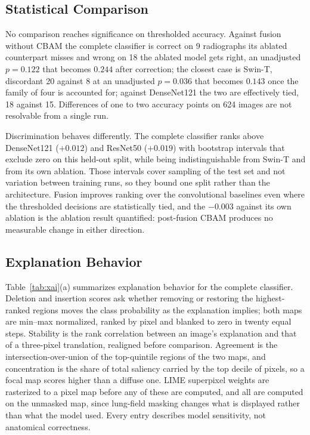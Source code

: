 \documentclass[conference]{IEEEtran}
\begin{document}
\subsection{Statistical Comparison}
No comparison reaches significance on thresholded accuracy. Against fusion
without CBAM the complete classifier is correct on 9 radiographs its ablated
counterpart misses and wrong on 18 the ablated model gets right, an unadjusted
$p=0.122$ that becomes $0.244$ after correction; the closest case is Swin-T, discordant 20 against 8 at an
unadjusted $p=0.036$ that becomes $0.143$ once the family of four is
accounted for; against DenseNet121 the two are effectively tied, 18 against
15. Differences of one to two accuracy points on 624 images are not
resolvable from a single run.

Discrimination behaves differently. The complete classifier ranks above
DenseNet121 ($+0.012$) and ResNet50 ($+0.019$) with bootstrap intervals that
exclude zero on this held-out split, while being indistinguishable from
Swin-T and from its own ablation. Those intervals cover sampling of the test
set and not variation between training runs, so they bound one split rather
than the architecture. Fusion improves
ranking over the convolutional baselines even where the thresholded
decisions are statistically tied, and the $-0.003$ against its own ablation
is the ablation result quantified: post-fusion CBAM produces no measurable
change in either direction.



\subsection{Explanation Behavior}
Table~\ref{tab:xai}(a) summarizes explanation behavior for the complete
classifier. Deletion and insertion scores \cite{petsiuk2018rise} ask whether
removing or restoring the highest-ranked regions moves the class probability
as the explanation implies; both maps are min--max normalized, ranked by
pixel and blanked to zero in twenty equal steps. Stability is the rank correlation between an
image's explanation and that of a three-pixel translation, realigned before
comparison. Agreement is the intersection-over-union of the top-quintile
regions of the two maps, and concentration is the share of total saliency
carried by the top decile of pixels, so a focal map scores higher than a
diffuse one. LIME superpixel weights are rasterized to a pixel map before
any of these are computed, and all are computed on the unmasked map, since
lung-field masking changes what is displayed rather than what the model
used. Every entry describes model sensitivity, not
anatomical correctness.
\end{document}
